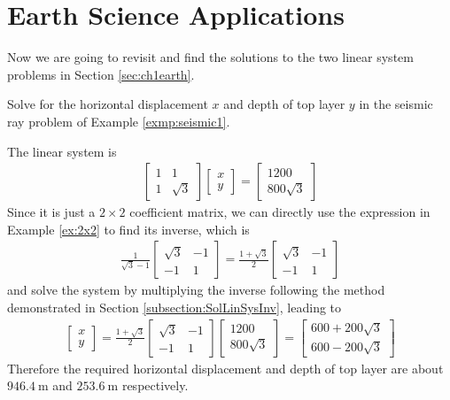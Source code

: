 \section{Earth Science Applications}
\label{sec:ch3earth}
Now we are going to revisit and find the solutions to the two linear system problems in Section \ref{sec:ch1earth}.
\begin{exmp}
Solve for the horizontal displacement $x$ and depth of top layer $y$ in the seismic ray problem of Example \ref{exmp:seismic1}.
\end{exmp}
\begin{solution}
The linear system is
\begin{align*}
\begin{bmatrix}
1 & 1 \\
1 & \sqrt{3}
\end{bmatrix}
\begin{bmatrix}
x \\
y
\end{bmatrix}
=
\begin{bmatrix}
1200 \\
800\sqrt{3}
\end{bmatrix}
\end{align*}
Since it is just a $2 \times 2$ coefficient matrix, we can directly use the expression in Example \ref{ex:2x2} to find its inverse, which is
\begin{align*}
\frac{1}{\sqrt{3}-1}
\begin{bmatrix}
\sqrt{3} & -1 \\
-1 & 1
\end{bmatrix}
=
\frac{1+\sqrt{3}}{2}
\begin{bmatrix}
\sqrt{3} & -1 \\
-1 & 1
\end{bmatrix}
\end{align*}
and solve the system by multiplying the inverse following the method demonstrated in Section \ref{subsection:SolLinSysInv}, leading to
\begin{align*}
\begin{bmatrix}
x \\
y
\end{bmatrix}
=
\frac{1+\sqrt{3}}{2}
\begin{bmatrix}
\sqrt{3} & -1 \\
-1 & 1
\end{bmatrix}
\begin{bmatrix}
1200 \\
800\sqrt{3}
\end{bmatrix}
=
\begin{bmatrix}
600+200\sqrt{3}\\
600-200\sqrt{3}
\end{bmatrix}
\end{align*}
Therefore the required horizontal displacement and depth of top layer are about $\SI{946.4}{\m}$ and $\SI{253.6}{\m}$ respectively.
\end{solution}

